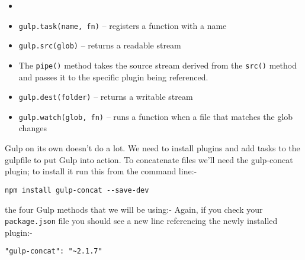 \begin{itemize}
\item
{}
\item
\verb|gulp.task(name, fn)| – registers a function with a name
\item
\verb|gulp.src(glob)| – returns a readable stream
\item
The \verb|pipe()| method takes the source stream derived from the \verb|src()| 
method and passes it to the specific plugin being referenced.
\item
\verb|gulp.dest(folder)| – returns a writable stream
\item
\verb|gulp.watch(glob, fn)| – runs a function when a file that matches the glob changes
\end{itemize}

Gulp on its own doesn’t do a lot. We need to install plugins and add tasks to the gulpfile to put Gulp into action. To concatenate files we’ll need the gulp-concat plugin; to install it run this from the command line:-

\begin{verbatim}
npm install gulp-concat --save-dev
\end{verbatim}
the four Gulp methods that we will be using:-
Again, if you check your \verb|package.json| 
file you should see a new line referencing the newly installed plugin:-

\begin{verbatim}
"gulp-concat": "~2.1.7"
\end{verbatim}


